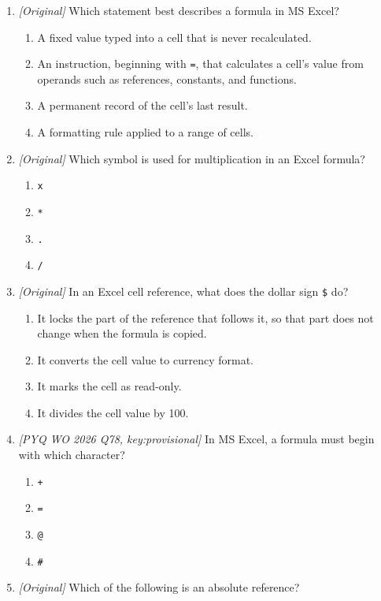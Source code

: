 \begin{enumerate}[label=\textbf{Q\arabic*.}, leftmargin=*]
\item \textit{[Original]} Which statement best describes a formula in
  MS Excel?
  \begin{enumerate}[label=\Alph*.]
    \item A fixed value typed into a cell that is never recalculated.
    \item An instruction, beginning with \texttt{=}, that calculates a cell's
      value from operands such as references, constants, and functions.
    \item A permanent record of the cell's last result.
    \item A formatting rule applied to a range of cells.
  \end{enumerate}
\item \textit{[Original]} Which symbol is used for multiplication in an Excel
  formula?
  \begin{enumerate}[label=\Alph*.]
    \item \texttt{x}
    \item \texttt{*}
    \item \texttt{.}
    \item \texttt{/}
  \end{enumerate}
\item \textit{[Original]} In an Excel cell reference, what does the dollar
  sign \texttt{\$} do?
  \begin{enumerate}[label=\Alph*.]
    \item It locks the part of the reference that follows it, so that part
      does not change when the formula is copied.
    \item It converts the cell value to currency format.
    \item It marks the cell as read-only.
    \item It divides the cell value by 100.
  \end{enumerate}
\item \textit{[PYQ WO 2026 Q78, key:provisional]} In MS Excel, a formula must
  begin with which character?
  \begin{enumerate}[label=\Alph*.]
    \item \texttt{+}
    \item \texttt{=}
    \item \texttt{@}
    \item \texttt{\#}
  \end{enumerate}
\item \textit{[Original]} Which of the following is an absolute reference?

\end{enumerate}
